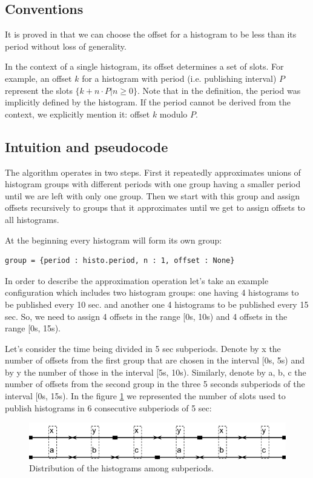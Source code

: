 \subsection{Conventions}

It is proved in \citep{goossens2003scheduling} that we can choose the offset for a histogram to be less than its period without loss of generality. 

In the context of a single histogram, its offset determines a set of slots. For example, an offset $k$ for a histogram with period (i.e. publishing interval) $P$ represent the slots $\{k+n\cdot P | n \geq 0\}$. Note that in the definition, the period was implicitly defined by the histogram. If the period cannot be derived from the context, we explicitly mention it: offset $k$ modulo $P$.

\subsection{Intuition and pseudocode}

The algorithm operates in two steps. First it repeatedly approximates unions of histogram groups with different periods with one group having a smaller period until we are left with only one group. Then we start with this group and assign offsets recursively to groups that it approximates until we get to assign offsets to all histograms.

At the beginning every histogram will form its own group:
\begin{verbatim}
group = {period : histo.period, n : 1, offset : None}
\end{verbatim}
In order to describe the approximation operation let’s take an example configuration which includes two histogram groups: one having 4 histograms to be published every 10 sec. and another one 4 histograms to be published every 15 sec. So, we need to assign 4 offsets in the range [0s, 10s) and 4 offsets in the range [0s, 15s).
 
Let’s consider the time being divided in 5 sec subperiods. Denote by x the number of offsets from the first group that are chosen in the interval [0s, 5s) and by y the number of those in the interval [5s, 10s). Similarly, denote by a, b, c the number of offsets from the second group in the three 5 seconds subperiods of the interval [0s, 15s). In the figure \ref{fig:subperiod} we represented the number of slots used to publish histograms in 6 consecutive subperiods of 5 sec:

\begin{figure}[ht!]
\centering
\includegraphics[scale=0.6]{Images/subperiod.png}
\caption{Distribution of the histograms among subperiods.}
\label{fig:subperiod}
\end{figure}

